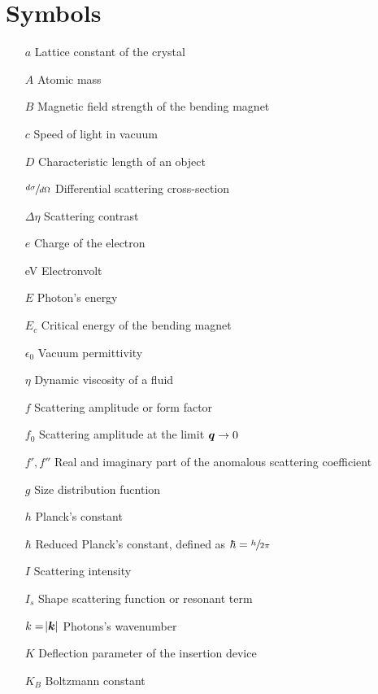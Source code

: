 \section*{Symbols}

\begin{itemize}
        
        \item[$a$] Lattice constant of the crystal
        \item[$A$] Atomic mass
        \item[$B$] Magnetic field strength of the bending magnet
        \item[$c$] Speed of light in vacuum     
        \item[$D$] Characteristic length of an object
        \item[$\sfrac{d\sigma}{d\Omega}$] Differential scattering cross-section   
        \item[$\Delta\eta$] Scattering contrast        
        \item[$e$] Charge of the electron  
        \item[eV] Electronvolt
        \item[$E$] Photon's energy
        \item[$E_c$] Critical energy of the bending magnet
        \item[$\epsilon_0$] Vacuum permittivity
        \item[$\eta$] Dynamic viscosity of a fluid 
        \item[$f$] Scattering amplitude or form factor
        \item[$f_0$] Scattering amplitude at the limit $\bm{q}\rightarrow 0$
        \item[$f',f''$] Real and imaginary part of the anomalous scattering coefficient
        \item[$g$] Size distribution fucntion
        \item[$h$] Planck's constant          
        \item[$\hbar$] Reduced Planck's constant, defined as $\hbar = \sfrac{h}{2 \pi}$
        \item[$I$] Scattering intensity
        \item[$I_s$] Shape scattering function or resonant term
        \item[$k=\abs{\bm{k}}$] Photons's wavenumber
        \item[$K$] Deflection parameter of the insertion device
        \item[$K_B$] Boltzmann constant

\end{itemize}
